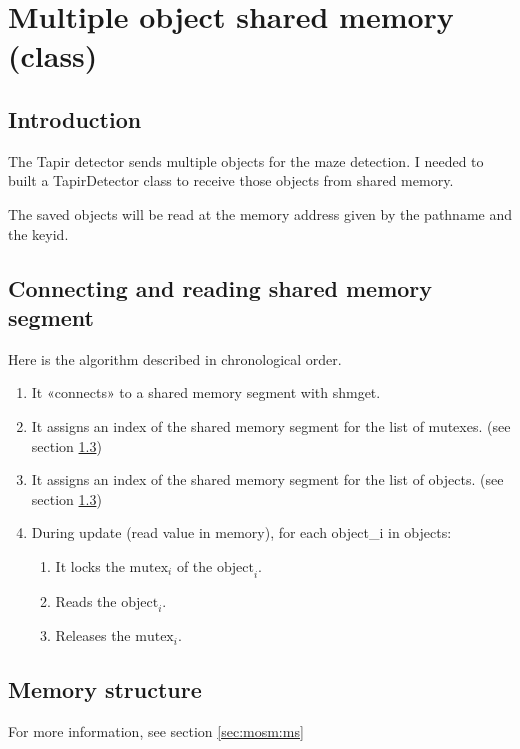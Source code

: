 \section{Multiple object shared memory (class)}
\label{sec:mosmc}

\subsection{Introduction}
\label{sec:mosmc:intro}

The Tapir detector sends multiple objects for the maze detection. I 
needed to built a TapirDetector class to receive those objects from 
shared memory.

The saved objects will be read at the memory address given by the 
pathname and the keyid.

\subsection{Connecting and reading shared memory segment}
\label{sec:mosmc:algo}
Here is the algorithm described in chronological order.

    \begin{enumerate}
        \item It «connects» to a shared memory segment with shmget.
        \item It assigns an index of the shared memory segment for the list 
            of mutexes. (see section \ref{sec:mosmc:ms})
        \item It assigns an index of the shared memory segment for the list 
            of objects. (see section \ref{sec:mosmc:ms})
        \item During update (read value in memory), for each object\_i in objects:
        \begin{enumerate}
           \item It locks the $\mbox{mutex}_i$ of the $\mbox{object}_i$.
            \item Reads the $\mbox{object}_i$.
            \item Releases the $\mbox{mutex}_i$.
        \end{enumerate}
 
    \end{enumerate}

\subsection{Memory structure}
\label{sec:mosmc:ms}
For more information, see section \ref{sec:mosm:ms}

